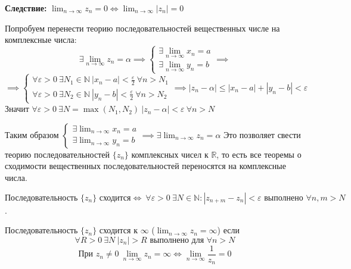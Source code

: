 \textbf{Следствие:} $\lim_{n \to \infty} z_n = 0 \iff \lim_{n \to \infty} \left| z_n \right| = 0$
        
    
Попробуем перенести теорию последовательностей вещественных числе на комплексные числа:
\[\exists \lim_{n \to \infty} z_n = \alpha \implies \begin{cases}
    \exists \lim_{n \to \infty} x_n = a \\
    \exists \lim_{n \to \infty} y_n = b
\end{cases} \implies \] 
\[ \implies \begin{cases}
    \forall \varepsilon > 0 \ \exists N_1 \in \mathbb{N} \ \left| x_n - a \right| < \frac{\varepsilon}{2} \ \forall n > N_1 \\
    \forall \varepsilon > 0 \ \exists N_2 \in \mathbb{N} \ \left| y_n - b \right| < \frac{\varepsilon}{2} \ \forall n > N_2 
\end{cases} \implies \left| z_n - \alpha\right| \leq \left| x_n - a \right| + \left| y_n - b\right| < \varepsilon\]
Значит $\forall \varepsilon > 0 \ \exists N = \max(N_1, N_2) \ \left|z_n - \alpha\right| < \varepsilon \ \forall n > N$

Таким образом $\begin{cases}
    \exists \lim_{n \to \infty} x_n = a \\
    \exists \lim_{n \to \infty} y_n = b
\end{cases}  \implies \exists \lim_{n \to \infty} z_n = \alpha$
Это позволяет свести теорию последовательностей $\{z_n\}$ комплексных чисел к $\mathbb{R}$, 
то есть все теоремы о сходимости вещественных последовательностей переносятся на комплексные числа.

\begin{theorem*}
    \[\text{Последовательность } \{z_n\} \text{ сходится} \iff \ \forall\varepsilon > 0 \ \exists N \in \mathbb{N}: \left| z_{n+m} - z_n \right|< \varepsilon  \text{ выполнено } \forall n, m > N\].
\end{theorem*}

\begin{definition}
    Последовательность $\{z_n\}$ сходится к $\infty$ ($\lim_{n \to \infty} z_n = \infty$) если
    \[\forall R > 0 \ \exists N \ \left| z_n \right| > R \text{ выполнено для } \forall n > N\]
    \[\text{При } z_n \neq 0 \ \lim_{n \to \infty}z_n = \infty \iff \lim_{n \to \infty} \frac{1}{z_n} = 0\]
\end{definition}
